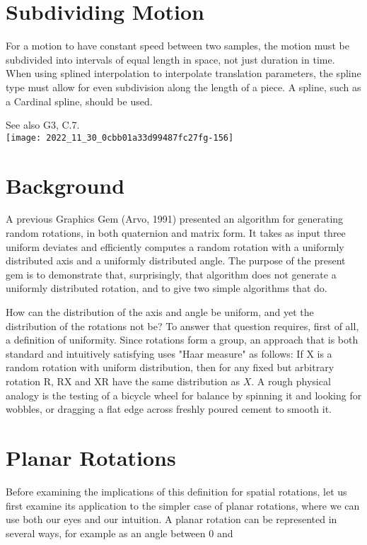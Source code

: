\section{Subdividing Motion}
For a motion to have constant speed between two samples, the motion must be subdivided into intervals of equal length in space, not just duration in time. When using splined interpolation to interpolate translation parameters, the spline type must allow for even subdivision along the length of a piece. A spline, such as a Cardinal spline, should be used.

See also G3, C.7.\\
\texttt{[image: 2022\_11\_30\_0cbb01a33d99487fc27fg-156]}

\section{Background}
A previous Graphics Gem (Arvo, 1991) presented an algorithm for generating random rotations, in both quaternion and matrix form. It takes as input three uniform deviates and efficiently computes a random rotation with a uniformly distributed axis and a uniformly distributed angle. The purpose of the present gem is to demonstrate that, surprisingly, that algorithm does not generate a uniformly distributed rotation, and to give two simple algorithms that do.

How can the distribution of the axis and angle be uniform, and yet the distribution of the rotations not be? To answer that question requires, first of all, a definition of uniformity. Since rotations form a group, an approach that is both standard and intuitively satisfying uses "Haar measure" as follows: If $\mathrm{X}$ is a random rotation with uniform distribution, then for any fixed but arbitrary rotation R, RX and XR have the same distribution as $X$. A rough physical analogy is the testing of a bicycle wheel for balance by spinning it and looking for wobbles, or dragging a flat edge across freshly poured cement to smooth it.

\section{Planar Rotations}
Before examining the implications of this definition for spatial rotations, let us first examine its application to the simpler case of planar rotations, where we can use both our eyes and our intuition. A planar rotation can be represented in several ways, for example as an angle between 0 and

